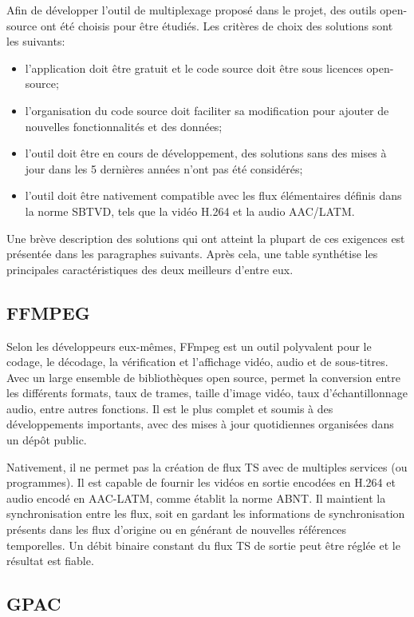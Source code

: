 \documentclass[12pt,a4paper]{article}
\begin{document}
Afin de développer l'outil de multiplexage proposé dans le projet, des outils open-source ont été choisis pour être étudiés. Les critères de choix des solutions sont les suivants:
\begin{itemize}
\item{l'application doit être gratuit et le code source doit être sous licences open-source;}
\item{l'organisation du code source doit faciliter sa modification pour ajouter de nouvelles fonctionnalités et des données;}
\item{l'outil doit être en cours de développement, des solutions sans des mises à jour dans les 5 dernières années n'ont pas été considérés;}
\item{l'outil doit être nativement compatible avec les flux élémentaires définis dans la norme SBTVD, tels que la vidéo H.264 et la audio AAC/LATM.}
\end{itemize}

Une brève description des solutions qui ont atteint la plupart de ces exigences est présentée dans les paragraphes suivants. Après cela, une table synthétise les principales caractéristiques des deux meilleurs d'entre eux.

\subsection{FFMPEG}

Selon les développeurs eux-mêmes, FFmpeg est un outil polyvalent pour le codage, le décodage, la vérification et l'affichage vidéo, audio et de sous-titres. Avec un large ensemble de bibliothèques open source, permet la conversion entre les différents formats, taux de trames, taille d'image vidéo, taux d'échantillonnage audio, entre autres fonctions. Il est le plus complet et soumis à des développements importants, avec des mises à jour quotidiennes organisées dans un dépôt public.

Nativement, il ne permet pas la création de flux TS avec de multiples services (ou programmes). Il est capable de fournir les vidéos en sortie encodées en H.264 et audio encodé en AAC-LATM, comme établit la norme ABNT. Il maintient la synchronisation entre les flux, soit en gardant les informations de synchronisation présents dans les flux d'origine ou en générant de nouvelles références temporelles. Un débit binaire constant du flux TS de sortie peut être réglée et le résultat est fiable.

\subsection{GPAC}
\end{document}
